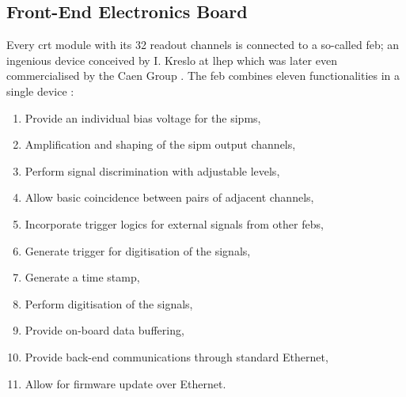 \subsection{Front-End Electronics Board}
Every \gls{crt} module with its \num{32} readout channels is connected to a so-called \gls{feb}; an ingenious device conceived by I. Kreslo at \gls{lhep} which was later even commercialised by the Caen Group \cite{CRTFEBCaen}. The \gls{feb} combines eleven functionalities in a single device \cite{CRTFrontEndElectronics}:
\begin{enumerate}
    \item Provide an individual bias voltage for the \glspl{sipm},
    \item Amplification and shaping of the \gls{sipm} output channels,
    \item Perform signal discrimination with adjustable levels,
    \item Allow basic coincidence between pairs of adjacent channels,
    \item Incorporate trigger logics for external signals from other \glspl{feb},
    \item Generate trigger for digitisation of the signals,
    \item Generate a time stamp,
    \item Perform digitisation of the signals,
    \item Provide on-board data buffering,
    \item Provide back-end communications through standard Ethernet,
    \item Allow for firmware update over Ethernet.
\end{enumerate}
